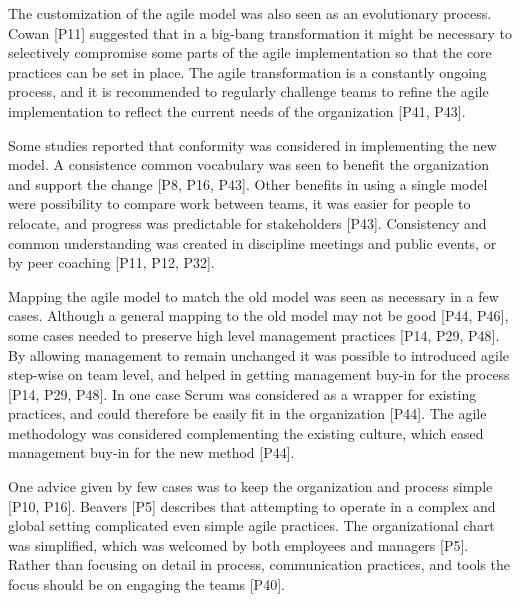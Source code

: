 \documentclass[preprint,authoryear,12pt]{elsarticle}
\begin{document}
The customization of the agile model was also seen as an evolutionary process.
Cowan [P11] suggested that in a big-bang transformation it might be necessary to
selectively compromise some parts of the agile implementation so that the core
practices can be set in place.
The agile transformation is a constantly ongoing process, and it is recommended
to regularly challenge teams to refine the agile implementation to reflect the
current needs of the organization [P41, P43].


Some studies reported that conformity was considered in implementing the new
model. A consistence common vocabulary was seen to benefit the organization and
support the change [P8, P16, P43]. Other benefits in using a single model were
possibility to compare work between teams, it was easier for people to relocate,
and progress was predictable for stakeholders [P43]. Consistency and common
understanding was created in discipline meetings and public events, or by peer
coaching [P11, P12, P32].


Mapping the agile model to match the old model was seen as necessary in a few
cases. Although a general mapping to the old model may not be good [P44, P46],
some cases needed to preserve high level management practices [P14, P29, P48].
By allowing management to remain unchanged it was possible to introduced agile
step-wise on team level, and helped in getting management buy-in for the process
[P14, P29, P48].
In one case Scrum was considered as a wrapper for existing practices, and could
therefore be easily fit in the organization [P44]. The agile methodology was
considered complementing the existing culture, which eased management buy-in for
the new method [P44].


One advice given by few cases was to keep the organization and process simple
[P10, P16]. Beavers [P5] describes that attempting to operate in a complex and
global setting complicated even simple agile practices. The organizational chart
was simplified, which was welcomed by both employees and managers [P5]. Rather
than focusing on detail in process, communication practices, and tools the focus
should be on engaging the teams [P40].
\end{document}
